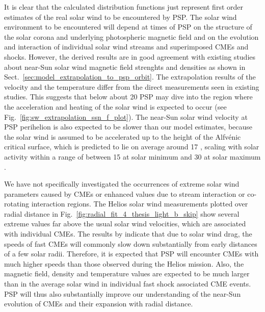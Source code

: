 It is clear that the calculated distribution functions just represent first order estimates of the real solar wind to be encountered by PSP. The solar wind environment to be encountered will depend at times of PSP on the structure of the solar corona and underlying photospheric magnetic field and on the evolution and interaction of individual solar wind streams and superimposed CMEs and shocks. However, the derived results are in good agreement with existing studies about near-Sun solar wind magnetic field strenghts and densities as shown in Sect.~\ref{sec:model_extrapolation_to_psp_orbit}. The extrapolation results of the velocity and the temperature differ from the direct measurements seen in existing studies. This suggests that below about \SI{20}{\Rs} PSP may dive into the region where the acceleration and heating of the solar wind is expected to occur (see Fig.~\ref{fig:sw_extrapolation_ssn_f_plot}). The near-Sun solar wind velocity at PSP perihelion is also expected to be slower than our model estimates, because the solar wind is assumed to be accelerated up to the height of the Alfvénic critical surface, which is predicted to lie on average around \SI{17}{\Rs} \citep[e.g.,][]{Sittler1999,Exarhos2000}, scaling with solar activity within a range of between \SI{15}{\Rs} at solar minimum and \SI{30}{\Rs} at solar maximum \citep{Katsikas2010,Goelzer2014}.	%

We have not specifically investigated the occurrences of extreme solar wind parameters caused by CMEs or enhanced values due to stream interaction or co-rotating interaction regions. The Helios solar wind measurements plotted over radial distance in Fig.~\ref{fig:radial_fit_4_thesis_light_b_skip} show several extreme values far above the usual solar wind velocities, which are associated with individual CMEs. The results by \citet{Sachdeva2017} indicate that due to solar wind drag, the speeds of fast CMEs will commonly slow down substantially from early distances of a few solar radii. Therefore, it is expected that PSP will encounter CMEs with much higher speeds than those observed during the Helios mission. Also, the magnetic field, density and temperature values are expected to be much larger than in the average solar wind in individual fast shock associated CME events. PSP will thus also substantially improve our understanding of the near-Sun evolution of CMEs and their expansion with radial distance.


